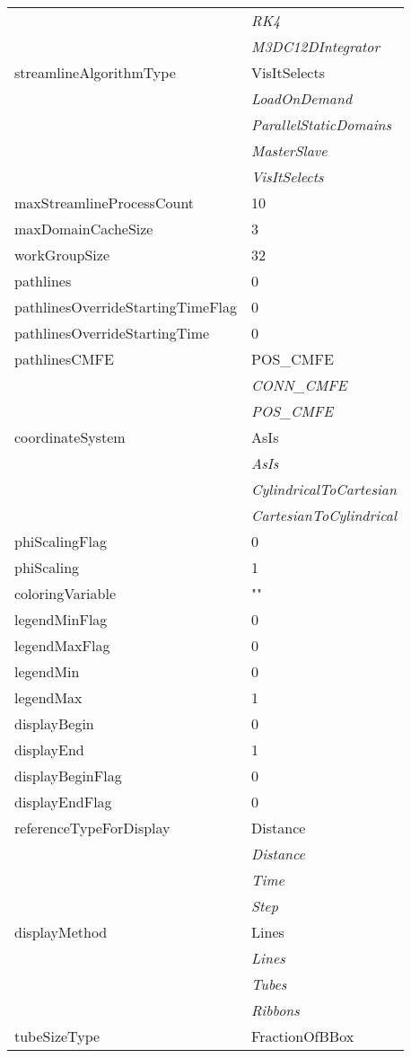 \documentclass[10pt,a4paper]{report}
\begin{document}
\begin{longtable}{ll}
 & {\it  RK4} \\
 & {\it  M3DC12DIntegrator} \\
streamlineAlgorithmType  &  VisItSelects   \\
 & {\it  LoadOnDemand} \\
 & {\it  ParallelStaticDomains} \\
 & {\it  MasterSlave} \\
 & {\it  VisItSelects} \\
maxStreamlineProcessCount  &  10 \\
maxDomainCacheSize  &  3 \\
workGroupSize  &  32 \\
pathlines  &  0 \\
pathlinesOverrideStartingTimeFlag  &  0 \\
pathlinesOverrideStartingTime  &  0 \\
pathlinesCMFE  &  POS\_CMFE   \\
 & {\it  CONN\_CMFE} \\
 & {\it  POS\_CMFE} \\
coordinateSystem  &  AsIs   \\
 & {\it  AsIs} \\
 & {\it  CylindricalToCartesian} \\
 & {\it  CartesianToCylindrical} \\
phiScalingFlag  &  0 \\
phiScaling  &  1 \\
coloringVariable  &  "" \\
legendMinFlag  &  0 \\
legendMaxFlag  &  0 \\
legendMin  &  0 \\
legendMax  &  1 \\
displayBegin  &  0 \\
displayEnd  &  1 \\
displayBeginFlag  &  0 \\
displayEndFlag  &  0 \\
referenceTypeForDisplay  &  Distance   \\
 & {\it  Distance} \\
 & {\it  Time} \\
 & {\it  Step} \\
displayMethod  &  Lines   \\
 & {\it  Lines} \\
 & {\it  Tubes} \\
 & {\it  Ribbons} \\
tubeSizeType  &  FractionOfBBox   \\

\end{longtable}
\end{document}
